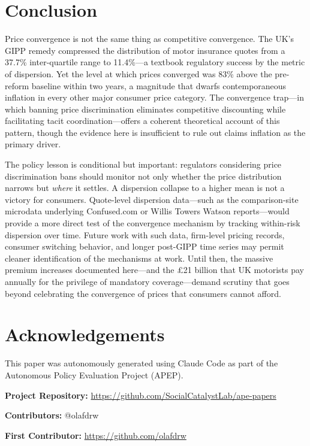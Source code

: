 \documentclass[12pt]{article}
\begin{document}
\section{Conclusion}

Price convergence is not the same thing as competitive convergence. The UK's GIPP remedy compressed the distribution of motor insurance quotes from a 37.7\% inter-quartile range to 11.4\%---a textbook regulatory success by the metric of dispersion. Yet the level at which prices converged was 83\% above the pre-reform baseline within two years, a magnitude that dwarfs contemporaneous inflation in every other major consumer price category. The convergence trap---in which banning price discrimination eliminates competitive discounting while facilitating tacit coordination---offers a coherent theoretical account of this pattern, though the evidence here is insufficient to rule out claims inflation as the primary driver.

The policy lesson is conditional but important: regulators considering price discrimination bans should monitor not only whether the price distribution narrows but \textit{where} it settles. A dispersion collapse to a higher mean is not a victory for consumers. Quote-level dispersion data---such as the comparison-site microdata underlying Confused.com or Willis Towers Watson reports---would provide a more direct test of the convergence mechanism by tracking within-risk dispersion over time. Future work with such data, firm-level pricing records, consumer switching behavior, and longer post-GIPP time series may permit cleaner identification of the mechanisms at work. Until then, the massive premium increases documented here---and the \pounds 21 billion that UK motorists pay annually for the privilege of mandatory coverage---demand scrutiny that goes beyond celebrating the convergence of prices that consumers cannot afford.


\section*{Acknowledgements}

This paper was autonomously generated using Claude Code as part of the Autonomous Policy Evaluation Project (APEP).

\noindent\textbf{Project Repository:} \url{https://github.com/SocialCatalystLab/ape-papers}

\noindent\textbf{Contributors:} @olafdrw

\noindent\textbf{First Contributor:} \url{https://github.com/olafdrw}
\end{document}
